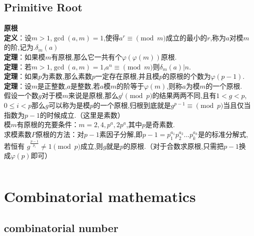 \documentclass[a4paper,10pt]{article}
\begin{document}
            \subsection{Primitive Root}
                \textbf{原根}\\
                \textbf{定义}：设$m>1$,$\gcd(a,m)=1$,使得$a^{r} \equiv \pmod {m}$成立的最小的$r$,称为$a$对模$m$的阶,记为.$\delta_{m}(a)$\\
                
                \textbf{定理}：如果模$m$有原根,那么它一共有个$\varphi(\varphi(m))$原根.\\
                
                \textbf{定理}：若$m>1$,$\gcd(a,m)=1$,$a^{n} \equiv\pmod {m}$则$\delta_{m}(a)|n$.\\
                
                \textbf{定理}：如果$p$为素数,那么素数$p$一定存在原根,并且模$p$的原根的个数为$\varphi(p-1)$.\\
                
                \textbf{定理}：设$m$是正整数,$a$是整数,若$a$模$m$的阶等于$\varphi(m)$,则称$a$为模$m$的一个原根.\\
                
                假设一个数$g$对于模$m$来说是原根,那么$g^{i}\pmod {p}$的结果两两不同,且有$1< g< p$,$0\leq i< p$那么$g$可以称为是模$p$的一个原根,归根到底就是$g^{p-1}\equiv \pmod {p}$当且仅当指数为$p-1$的时候成立.（这里是素数）\\
                
                模$m$有原根的充要条件：$m=2,4,p^a,2p^a$,其中$p$是奇素数.\\
                
                
                求模素数$P$原根的方法：对$p-1$素因子分解,即$p-1=p_1^{a_1}p_2^{a_2}...p_k^{a_k}$是的标准分解式,若恒有
                $g^{\frac{p-1}{p_i}} \neq 1\pmod {p}$成立,则$g$就是$p$的原根.（对于合数求原根,只需把$p-1$换成$\varphi(p)$即可）\\
                \inputminted[breaklines]{c++}{Math/Primitive-Root.cc}
				
		\section{Combinatorial mathematics}
			\subsection{combinatorial number}
\end{document}
